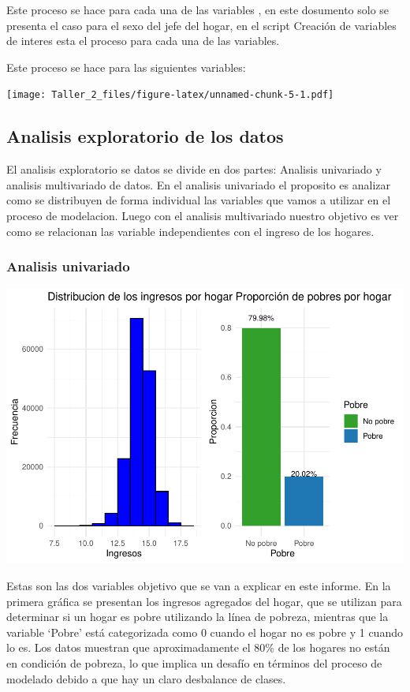 \documentclass[
]{article}
\begin{document}
Este proceso se hace para cada una de las variables , en este dosumento
solo se presenta el caso para el sexo del jefe del hogar, en el script
Creación de variables de interes esta el proceso para cada una de las
variables.

Este proceso se hace para las siguientes variables:

\texttt{[image: Taller\_2\_files/figure-latex/unnamed-chunk-5-1.pdf]}

\hypertarget{analisis-exploratorio-de-los-datos}{%
\subsection{Analisis exploratorio de los
datos}\label{analisis-exploratorio-de-los-datos}}

El analisis exploratorio se datos se divide en dos partes: Analisis
univariado y analisis multivariado de datos. En el analisis univariado
el proposito es analizar como se distribuyen de forma individual las
variables que vamos a utilizar en el proceso de modelacion. Luego con el
analisis multivariado nuestro objetivo es ver como se relacionan las
variable independientes con el ingreso de los hogares.

\hypertarget{analisis-univariado}{%
\subsubsection{Analisis univariado}\label{analisis-univariado}}

\includegraphics{Taller_2_files/figure-latex/unnamed-chunk-6-1.pdf}

Estas son las dos variables objetivo que se van a explicar en este
informe. En la primera gráfica se presentan los ingresos agregados del
hogar, que se utilizan para determinar si un hogar es pobre utilizando
la línea de pobreza, mientras que la variable `Pobre' está categorizada
como 0 cuando el hogar no es pobre y 1 cuando lo es. Los datos muestran
que aproximadamente el 80\% de los hogares no están en condición de
pobreza, lo que implica un desafío en términos del proceso de modelado
debido a que hay un claro desbalance de clases.
\end{document}
